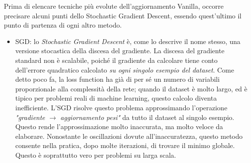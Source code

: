 Prima di elencare tecniche più evolute dell'aggiornamento Vanilla, occorre precisare alcuni punti dello Stochastic Gradient Descent, essendo quest'ultimo il punto di partenza di ogni altro metodo. 

\begin{itemize}
\item \textsc{SGD}: lo \emph{Stochastic Gradient Descent} è, come lo descrive il nome stesso, una versione stocastica della discesa del gradiente. La discesa del gradiente standard non è scalabile, poiché il gradiente da calcolare tiene conto dell'errore quadratico calcolato \emph{su ogni singolo esempio del dataset}. Come detto poco fa, la loss function ha già di per sé un numero di variabili proporzionale alla complessità della rete; quando il dataset è molto largo, ed è tipico per problemi reali di machine learning, questo calcolo diventa inefficiente. L'SGD risolve questo problema approssimando l'operazione \emph{"gradiente $\rightarrow$ aggiornamento pesi"} da tutto il dataset al singolo esempio. Questo rende l'approssimazione molto inaccurata, ma molto veloce da elaborare. Nonostante le oscillazioni dovute all'inaccuratezza, questo metodo consente nella pratica, dopo molte iterazioni, di trovare il minimo globale. Questo è soprattutto vero per problemi su larga scala. 


\end{itemize}
